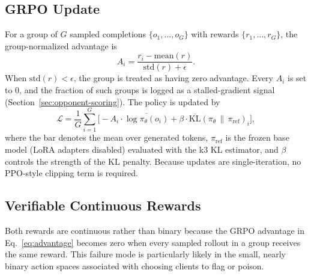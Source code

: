 \documentclass[conference]{IEEEtran}
\begin{document}
\subsection{GRPO Update}
For a group of $G$ sampled completions $\{o_1,\dots,o_G\}$ with rewards $\{r_1,\dots,r_G\}$, the group-normalized advantage is
\begin{equation}
A_i = \frac{r_i - \mathrm{mean}(r)}{\mathrm{std}(r) + \epsilon}.
\label{eq:advantage}
\end{equation}
When $\mathrm{std}(r) < \epsilon$, the group is treated as having zero advantage. Every $A_i$ is set to 0, and the fraction of such groups is logged as a stalled-gradient signal (Section~\ref{sec:opponent-scoring}). The policy is updated by
\begin{equation}
\mathcal{L} = \frac{1}{G}\sum_{i=1}^{G}\Big[-A_i \cdot \overline{\log \pi_\theta(o_i)} + \beta \cdot \overline{\mathrm{KL}}(\pi_\theta \,\|\, \pi_{\mathrm{ref}})_i\Big],
\label{eq:grpo-loss}
\end{equation}
where the bar denotes the mean over generated tokens, $\pi_{\mathrm{ref}}$ is the frozen base model (LoRA adapters disabled) evaluated with the k3 KL estimator, and $\beta$ controls the strength of the KL penalty. Because updates are single-iteration, no PPO-style clipping term is required.

\subsection{Verifiable Continuous Rewards}
\label{sec:rewards}
Both rewards are continuous rather than binary because the GRPO advantage in Eq.~\eqref{eq:advantage} becomes zero when every sampled rollout in a group receives the same reward. This failure mode is particularly likely in the small, nearly binary action spaces associated with choosing clients to flag or poison.
\end{document}
